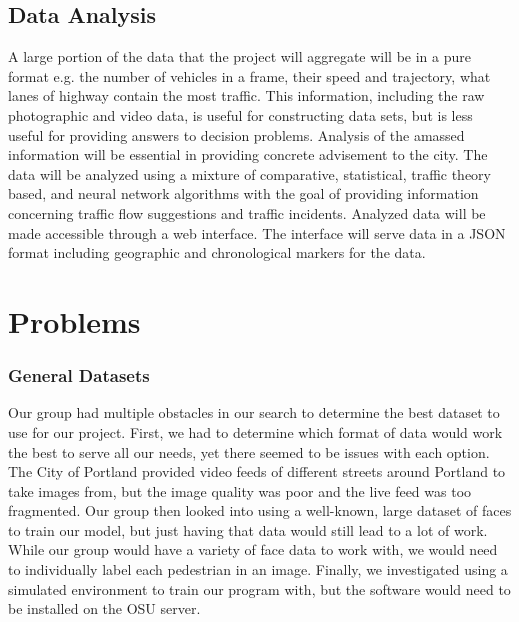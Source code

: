 \subsection{Data Analysis}
A large portion of the data that the project will aggregate will be in a pure format e.g. the number of vehicles in a frame, their speed and trajectory, what lanes of highway contain the most traffic. This information, including the raw photographic and video data, is useful for constructing data sets, but is less useful for providing answers to decision problems. Analysis of the amassed information will be essential in providing concrete advisement to the city.  
The data will be analyzed using a mixture of comparative, statistical,  traffic  theory  based,  and  neural  network  algorithms with the goal of providing information concerning traffic flow suggestions and traffic incidents. 
Analyzed data will be made accessible through a web interface. The interface will serve data in a JSON format including geographic and chronological markers for the data.

\section{Problems}
\subsubsection{General Datasets}
Our group had multiple obstacles in our search to determine the best dataset to use for our project. First, we had to determine which format of data would work the best to serve all our needs, yet there seemed to be issues with each option. The City of Portland provided video feeds of different streets around Portland to take images from, but the image quality was poor and the live feed was too fragmented. Our group then looked into using a well-known, large dataset of faces to train our model, but just having that data would still lead to a lot of work. While our group would have a variety of face data to work with, we would need to individually label each pedestrian in an image. Finally, we investigated using a simulated environment to train our program with, but the software would need to be installed on the OSU server. 


